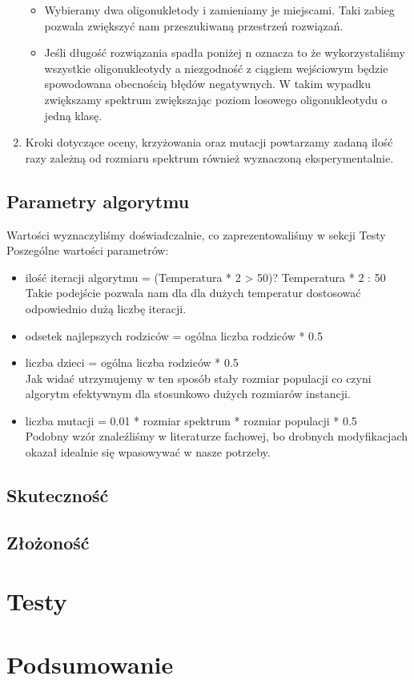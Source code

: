 \documentclass{article}
\begin{document}
\begin{enumerate}
\begin{itemize}
\item Wybieramy dwa oligonukletody i zamieniamy je miejscami. Taki zabieg pozwala zwiększyć nam przeszukiwaną przestrzeń rozwiązań.
\item Jeśli długość rozwiązania spadła poniżej n oznacza to że wykorzystaliśmy wszystkie oligonukleotydy a niezgodność z ciągiem wejściowym będzie spowodowana obecnością błędów negatywnych. W takim wypadku zwiększamy spektrum zwiększając poziom losowego oligonukleotydu o jedną klasę.
\end{itemize}	
\item Kroki dotyczące oceny, krzyżowania oraz mutacji powtarzamy zadaną ilość razy zależną od rozmiaru spektrum również wyznaczoną eksperymentalnie.
\end{enumerate}
\subsection{Parametry algorytmu}
Wartości wyznaczyliśmy doświadczalnie, co zaprezentowaliśmy w sekcji Testy
Poszególne wartości parametrów:
\begin{itemize}
\item ilość iteracji algorytmu = (Temperatura * 2 > 50)? Temperatura * 2 : 50
\\Takie podejście pozwala nam dla dla dużych temperatur dostosować odpowiednio dużą liczbę iteracji.
\item odsetek najlepszych rodziców = ogólna liczba rodziców * 0.5
\item liczba dzieci = ogólna liczba rodziców * 0.5
\\Jak widać utrzymujemy w ten sposób stały rozmiar populacji co czyni algorytm efektywnym dla stosunkowo dużych rozmiarów instancji.
\item liczba mutacji = 0.01 * rozmiar spektrum * rozmiar populacji * 0.5
\\Podobny wzór znaleźliśmy w literaturze fachowej, bo drobnych modyfikacjach okazał idealnie się wpasowywać w nasze potrzeby.
\end{itemize}
\subsection{Skuteczność}

\subsection{Złożoność}

\section{Testy}

\section{Podsumowanie}
\end{document}
